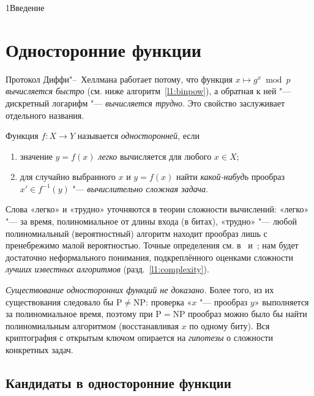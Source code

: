 \begin{lecture}{1}{Введение}

\section{Односторонние функции}

Протокол Диффи"--~Хеллмана работает потому, что функция $x \mapsto g^x \bmod p$
\emph{вычисляется быстро} (см. ниже алгоритм~\ref{l1:binpow}), а обратная к ней "---
дискретный логарифм "--- \emph{вычисляется трудно}. Это свойство заслуживает отдельного
названия.

\begin{definition}[неформальное]\label{l1:owf}
Функция $f\colon X \to Y$ называется \emph{односторонней}, если
\begin{enumerate}
  \item значение $y = f(x)$ \emph{легко} вычисляется для любого $x \in X$;
  \item для случайно выбранного $x$ и $y = f(x)$ найти \emph{какой-нибудь} прообраз
    $x' \in f^{-1}(y)$ "--- \emph{вычислительно сложная задача}.
\end{enumerate}
\end{definition}

Слова «легко» и «трудно» уточняются в теории сложности вычислений: «легко» "--- за время,
полиномиальное от длины входа (в битах), «трудно» "--- любой полиномиальный (вероятностный)
алгоритм находит прообраз лишь с пренебрежимо малой вероятностью. Точные определения см.
в~\cite[разд.~1.3]{hac} и~\cite[гл.~8]{hps}; нам будет достаточно неформального понимания,
подкреплённого оценками сложности \emph{лучших известных алгоритмов} (разд.~\ref{l1:complexity}).

\begin{remark}
\emph{Существование односторонних функций не доказано.} Более того, из их существования
следовало бы $\mathrm P \ne \mathrm{NP}$: проверка «$x$ "--- прообраз $y$» выполняется за
полиномиальное время, поэтому при $\mathrm P = \mathrm{NP}$ прообраз можно было бы найти
полиномиальным алгоритмом (восстанавливая $x$ по одному биту). Вся криптография с открытым
ключом опирается на \emph{гипотезы} о сложности конкретных задач.
\end{remark}

\subsection{Кандидаты в односторонние функции}


\end{lecture}
